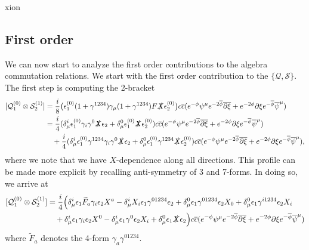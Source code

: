 xion\documentclass[12pt]{article}
\def\ie{\begin{equation}\begin{aligned}}
\def\fe{\end{aligned}\end{equation}}
\numberwithin{equation}{section}
\newcommand{\WT}[1]{\widetilde{#1}}
\newcommand{\B}[1]{\overline{#1}}
\begin{document}
\subsection{First order}
We can now start to analyze the first order contributions to the algebra commutation relations. We start with the first order contribution to the $\{\mathcal{Q},\mathcal{S}\}$. The first step is computing the 2-bracket
\ie
    [\mathcal{Q}^{(0)}_1\otimes\mathcal{S}^{(1)}_2]&=\frac{i}{8}\big(\epsilon^{(0)}_1(1+\gamma^{1234})\gamma_{\mu}(1+\gamma^{1234})F\slashed{X}\epsilon_2^{(0)}\big)c\B{c}(e^{-\phi}\psi^{\mu}e^{-2\B{\phi}}\B{\partial}\B{\xi}+e^{-2\phi}\partial\xi e^{-\B{\phi}}\B{\psi}^{\mu})\\
    &=\frac{i}{4}(\delta_{\mu}^i\epsilon_1^{(0)}\gamma_i\gamma^0\slashed{X}\epsilon_2+\delta_{\mu}^0\epsilon_1^{(0)}\slashed{X}\epsilon_2^{(0)})c\B{c}(e^{-\phi}\psi^{\mu}e^{-2\B{\phi}}\B{\partial}\B{\xi}+e^{-2\phi}\partial\xi e^{-\B{\phi}}\B{\psi}^{\mu})\\
    &\quad+\frac{i}{4}(\delta_{\mu}^i\epsilon_1^{(0)}\gamma^{1234}\gamma_i\gamma^0\slashed{X}\epsilon_2+\delta_{\mu}^0\epsilon_1^{(0)}\gamma^{1234}\slashed{X}\epsilon_2^{(0)})c\B{c}(e^{-\phi}\psi^{\mu}e^{-2\B{\phi}}\B{\partial}\B{\xi}+e^{-2\phi}\partial\xi e^{-\B{\phi}}\B{\psi}^{\mu}),
\fe
where we note that we have $X$-dependence along all directions. This profile can be made more explicit by recalling anti-symmetry of 3 and 7-forms. In doing so, we arrive at
\ie
    [\mathcal{Q}^{(0)}_1\otimes\mathcal{S}^{(1)}_2]&=\frac{i}{4}\Big(\delta_{\mu}^i\epsilon_{1}\WT{F}_a\gamma_i\epsilon_2X^a-\delta_{\mu}^iX_i\epsilon_1\gamma^{01234}\epsilon_2+\delta_{\mu}^0\epsilon_1\gamma^{01234}\epsilon_2X_0+\delta_{\mu}^0\epsilon_1\gamma^{i1234}\epsilon_2X_i\\
    &\quad+\delta_{\mu}^i\epsilon_1\gamma_i\epsilon_2 X^0-\delta_{\mu}^i\epsilon_1\gamma^0\epsilon_2X_i+\delta_{\mu}^0\epsilon_1\slashed{X}\epsilon_2\Big)c\B{c}(e^{-\phi}\psi^{\mu}e^{-2\B{\phi}}\B{\partial}\B{\xi}+e^{-2\phi}\partial\xi e^{-\B{\phi}}\B{\psi}^{\mu})
\fe
where $\WT{F}_a$ denotes the 4-form $\gamma_a\gamma^{01234}$.
\end{document}
